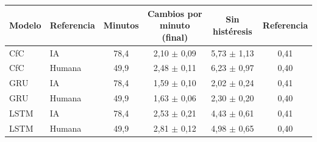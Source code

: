 \begin{tabular}{|l|l|c|c|c|c|}
\hline
\textbf{Modelo} & \textbf{Referencia} & \textbf{Minutos} & \textbf{Cambios por minuto (final)} & \textbf{Sin histéresis} & \textbf{Referencia} \\ \hline
CfC & IA & 78{,}4 & 2{,}10 $\pm$ 0{,}09 & 5{,}73 $\pm$ 1{,}13 & 0{,}41 \\ \hline
CfC & Humana & 49{,}9 & 2{,}48 $\pm$ 0{,}11 & 6{,}23 $\pm$ 0{,}97 & 0{,}40 \\ \hline
GRU & IA & 78{,}4 & 1{,}59 $\pm$ 0{,}10 & 2{,}02 $\pm$ 0{,}24 & 0{,}41 \\ \hline
GRU & Humana & 49{,}9 & 1{,}63 $\pm$ 0{,}06 & 2{,}30 $\pm$ 0{,}20 & 0{,}40 \\ \hline
LSTM & IA & 78{,}4 & 2{,}53 $\pm$ 0{,}21 & 4{,}43 $\pm$ 0{,}61 & 0{,}41 \\ \hline
LSTM & Humana & 49{,}9 & 2{,}81 $\pm$ 0{,}12 & 4{,}98 $\pm$ 0{,}65 & 0{,}40 \\ \hline
\end{tabular}
